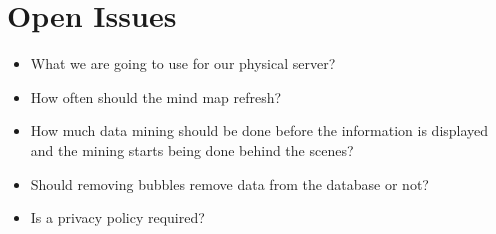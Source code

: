 \documentclass[hidelinks,english]{article}
\begin{document}
	\section{Open Issues}
		\begin{itemize}
			\item What we are going to use for our physical server?
			\item How often should the mind map refresh?
			\item How much data mining should be done before the information is displayed and the mining starts being done behind the scenes?
			\item Should removing bubbles remove data from the database or not?
			\item Is a privacy policy required?
		\end{itemize}
\end{document}
